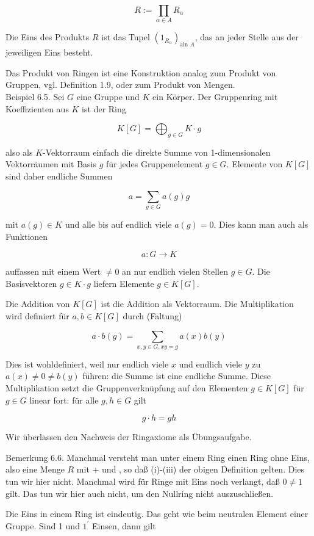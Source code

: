 \documentclass[10pt, letterpaper]{article}
\begin{document}
$$
R:=\prod_{\alpha \in A} R_{\alpha}
$$

Die Eins des Produkts $R$ ist das Tupel $\left(1_{R_{\alpha}}\right)_{\text {ain } A}$, das an jeder Stelle aus der jeweiligen Eins besteht.

Das Produkt von Ringen ist eine Konstruktion analog zum Produkt von Gruppen, vgl. Definition 1.9, oder zum Produkt von Mengen.\\
Beispiel 6.5. Sei $G$ eine Gruppe und $K$ ein Körper. Der Gruppenring mit Koeffizienten aus $K$ ist der Ring

$$
K[G]=\bigoplus_{g \in G} K \cdot g
$$

also als $K$-Vektorraum einfach die direkte Summe von 1-dimensionalen Vektorräumen mit Basis $g$ für jedes Gruppenelement $g \in G$. Elemente von $K[G]$ sind daher endliche Summen

$$
a=\sum_{g \in G} a(g) g
$$

mit $a(g) \in K$ und alle bis auf endlich viele $a(g)=0$. Dies kann man auch als Funktionen

$$
a: G \rightarrow K
$$

auffassen mit einem Wert $\neq 0$ an nur endlich vielen Stellen $g \in G$. Die Basisvektoren $g \in K \cdot g$ liefern Elemente $g \in K[G]$.

Die Addition von $K[G]$ ist die Addition als Vektorraum. Die Multiplikation wird definiert für $a, b \in K[G]$ durch (Faltung)

$$
a \cdot b(g)=\sum_{x, y \in G, x y=g} a(x) b(y)
$$

Dies ist wohldefiniert, weil nur endlich viele $x$ und endlich viele $y$ zu $a(x) \neq 0 \neq b(y)$ führen: die Summe ist eine endliche Summe. Diese Multiplikation setzt die Gruppenverknüpfung auf den Elementen $g \in K[G]$ für $g \in G$ linear fort: für alle $g, h \in G$ gilt

$$
g \cdot h=g h
$$

Wir überlassen den Nachweis der Ringaxiome als Übungsaufgabe.

Bemerkung 6.6. Manchmal versteht man unter einem Ring einen Ring ohne Eins, also eine Menge $R$ mit + und , so daß (i)-(iii) der obigen Definition gelten. Dies tun wir hier nicht. Manchmal wird für Ringe mit Eins noch verlangt, daß $0 \neq 1$ gilt. Das tun wir hier auch nicht, um den Nullring nicht auszuschließen.

Die Eins in einem Ring ist eindeutig. Das geht wie beim neutralen Element einer Gruppe. Sind 1 und $1^{\prime}$ Einsen, dann gilt
\end{document}
